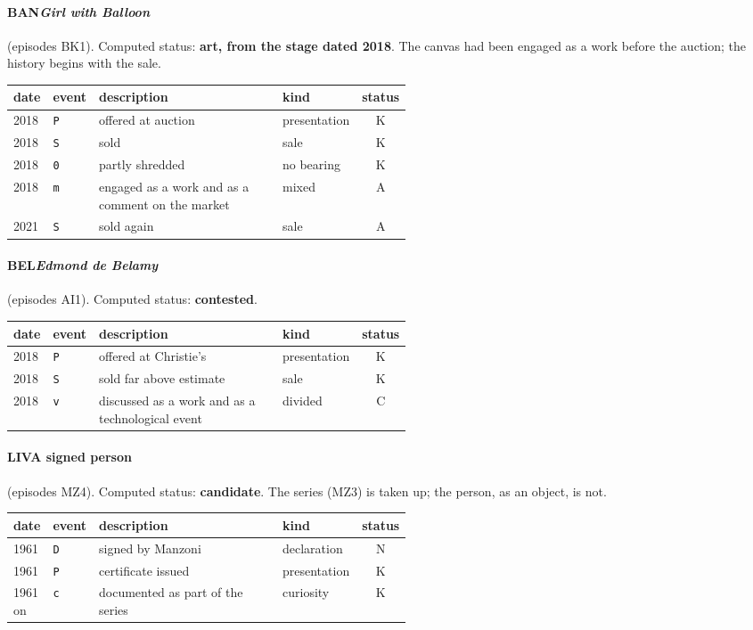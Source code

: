\paragraph{BAN\enspace \emph{Girl with Balloon}} (episodes BK1). Computed status: \textbf{art, from the stage dated 2018}. The canvas had been engaged as a work before the auction; the history begins with the sale.
\begin{center}\footnotesize\begin{tabular}{@{}llp{0.52\linewidth}lc@{}}
date & event & description & kind & status \\ \midrule
2018 & \texttt{P} & offered at auction & presentation & K \\
2018 & \texttt{S} & sold & sale & K \\
2018 & \texttt{0} & partly shredded & no bearing & K \\
2018 & \texttt{m} & engaged as a work and as a comment on the market & mixed & A \\
2021 & \texttt{S} & sold again & sale & A \\
\end{tabular}\end{center}

\paragraph{BEL\enspace \emph{Edmond de Belamy}} (episodes AI1). Computed status: \textbf{contested}.
\begin{center}\footnotesize\begin{tabular}{@{}llp{0.52\linewidth}lc@{}}
date & event & description & kind & status \\ \midrule
2018 & \texttt{P} & offered at Christie's & presentation & K \\
2018 & \texttt{S} & sold far above estimate & sale & K \\
2018 & \texttt{v} & discussed as a work and as a technological event & divided & C \\
\end{tabular}\end{center}

\paragraph{LIV\enspace A signed person} (episodes MZ4). Computed status: \textbf{candidate}. The series (MZ3) is taken up; the person, as an object, is not.
\begin{center}\footnotesize\begin{tabular}{@{}llp{0.52\linewidth}lc@{}}
date & event & description & kind & status \\ \midrule
1961 & \texttt{D} & signed by Manzoni & declaration & N \\
1961 & \texttt{P} & certificate issued & presentation & K \\
1961 on & \texttt{c} & documented as part of the series & curiosity & K \\
\end{tabular}\end{center}

